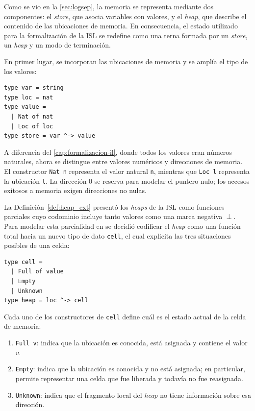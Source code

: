 \documentclass[a4paper,	11pt]{report}
\begin{document}
Como se vio en la \autoref{sec:logsep},
la memoria se representa mediante dos componentes:
el \emph{store},
que asocia variables con valores,
y el \emph{heap},
que describe el contenido de las ubicaciones de memoria.
En consecuencia,
el estado utilizado para la formalización de la ISL se redefine como una terna formada por un \emph{store},
un \emph{heap} y un modo de terminación.

En primer lugar,
se incorporan las ubicaciones de memoria y se amplía el tipo de los valores:

\begin{lstlisting}
type var = string
type loc = nat
type value =
  | Nat of nat
  | Loc of loc
type store = var ^-> value
\end{lstlisting}

A diferencia del \autoref{cap:formalizacion-il},
donde todos los valores eran números naturales,
ahora se distingue entre valores numéricos y direcciones de memoria.
El constructor \lstinline|Nat n| representa el valor natural \lstinline|n|,
mientras que \lstinline|Loc l| representa la ubicación \lstinline|l|.
La dirección 0 se reserva para modelar el puntero nulo;
los accesos exitosos a memoria exigen direcciones no nulas.

La Definición~\ref{def:heap_ext} presentó los \emph{heaps} de la ISL como funciones parciales
cuyo codominio incluye tanto valores como una marca negativa $\perp$.
Para modelar esta parcialidad en \fstar{} se decidió codificar el \emph{heap} como una función total hacia un nuevo tipo de dato \lstinline|cell|,
el cual explicita las tres situaciones posibles de una celda:

\begin{lstlisting}
type cell =
  | Full of value
  | Empty
  | Unknown
type heap = loc ^-> cell
\end{lstlisting}

Cada uno de los constructores de \lstinline|cell| define cuál es el estado actual de la celda de memoria:
\begin{enumerate}
  \item \lstinline|Full v|:
  indica que la ubicación es conocida,
  está asignada y contiene el valor $v$.
  \item \lstinline|Empty|:
  indica que la ubicación es conocida y no está asignada;
  en particular,
  permite representar una celda que fue liberada y todavía no fue reasignada.
  \item \lstinline|Unknown|:
  indica que el fragmento local del \emph{heap} no tiene información sobre esa dirección.
\end{enumerate}
\end{document}
